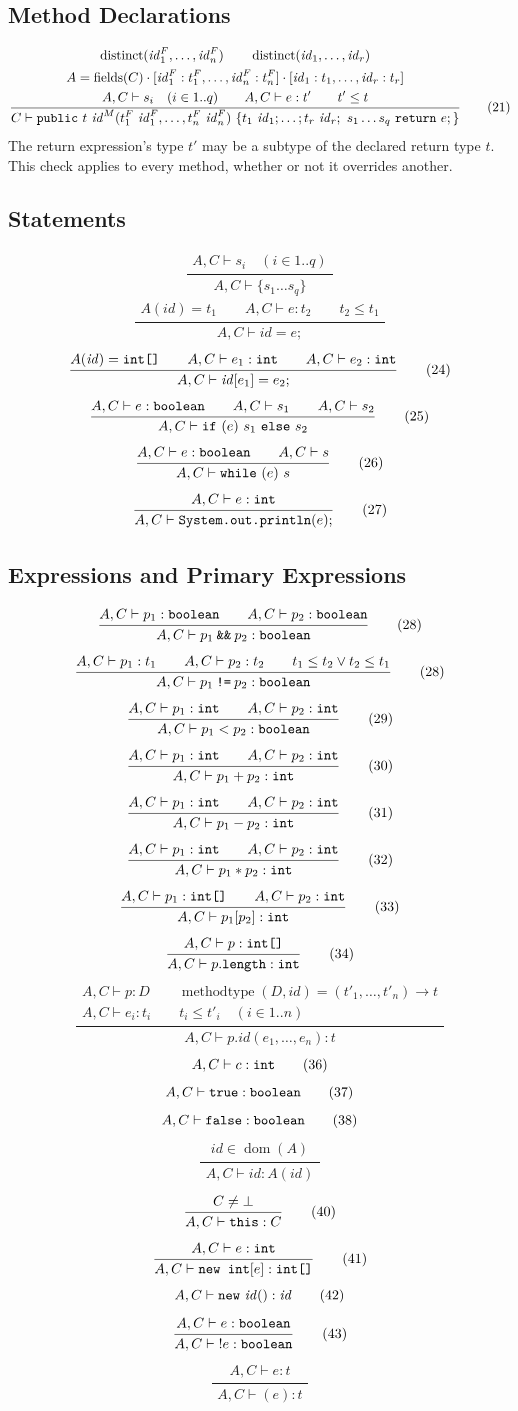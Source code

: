 \documentclass[11pt,a4paper]{article}
\newcommand{\kw}[1]{\text{\texttt{#1}}}
\newcommand{\mt}{\operatorname{methodtype}}
\newcommand{\fld}{\operatorname{fields}}
\newcommand{\dist}{\operatorname{distinct}}
\newcommand{\id}{\mathit{id}}
\newcommand{\ruleeq}[3]{\begin{equation}\frac{\begin{gathered}#2\end{gathered}}{\begin{gathered}#3\end{gathered}}\tag{#1}\end{equation}}
\newcommand{\axiom}[2]{\begin{equation}#2\tag{#1}\end{equation}}
\newcommand{\method}{\kw{public}\ t\ \id^M(t_1^F\ \id_1^F,\ldots,t_n^F\ \id_n^F)\ \{t_1\ \id_1;\ldots;t_r\ \id_r;\ s_1\ldots s_q\ \kw{return}\ e;\}}
\begin{document}
\subsection{Method Declarations}
\begingroup\small
\ruleeq{21}{\dist(\id_1^F,\ldots,\id_n^F)\qquad\dist(\id_1,\ldots,\id_r)\\
A=\fld(C)\cdot[\id_1^F:t_1^F,\ldots,\id_n^F:t_n^F]\cdot[\id_1:t_1,\ldots,\id_r:t_r]\\
A,C\vdash s_i\quad(i\in1..q)\qquad A,C\vdash e:t'\qquad t'\leq t}
{C\vdash\method}
\endgroup
The return expression's type $t'$ may be a subtype of the declared return type
$t$. This check applies to every method, whether or not it overrides another.
\subsection{Statements}
\ruleeq{22}{A,C\vdash s_i\quad(i\in1..q)}{A,C\vdash\{s_1\ldots s_q\}}
\ruleeq{23}{A(\id)=t_1\qquad A,C\vdash e:t_2\qquad t_2\leq t_1}{A,C\vdash\id=e;}
\ruleeq{24}{A(\id)=\kw{int[]}\qquad A,C\vdash e_1:\kw{int}\qquad A,C\vdash e_2:\kw{int}}{A,C\vdash\id[e_1]=e_2;}
\ruleeq{25}{A,C\vdash e:\kw{boolean}\qquad A,C\vdash s_1\qquad A,C\vdash s_2}{A,C\vdash\kw{if}\ (e)\ s_1\ \kw{else}\ s_2}
\ruleeq{26}{A,C\vdash e:\kw{boolean}\qquad A,C\vdash s}{A,C\vdash\kw{while}\ (e)\ s}
\ruleeq{27}{A,C\vdash e:\kw{int}}{A,C\vdash\kw{System.out.println}(e);}

\newpage
\subsection{Expressions and Primary Expressions}
\begingroup
\setlength{\abovedisplayskip}{7pt}\setlength{\belowdisplayskip}{7pt}
\ruleeq{28}{A,C\vdash p_1:\kw{boolean}\qquad A,C\vdash p_2:\kw{boolean}}{A,C\vdash p_1\mathbin{\kw{\&\&}}p_2:\kw{boolean}}
\ruleeq{28}{A,C\vdash p_1:t_1\qquad A,C\vdash p_2:t_2\qquad t_1 \leq t_2 \lor t_2 \leq t_1}{A,C\vdash p_1\mathbin{\kw{!=}}p_2:\kw{boolean}}
\ruleeq{29}{A,C\vdash p_1:\kw{int}\qquad A,C\vdash p_2:\kw{int}}{A,C\vdash p_1<p_2:\kw{boolean}}
\ruleeq{30}{A,C\vdash p_1:\kw{int}\qquad A,C\vdash p_2:\kw{int}}{A,C\vdash p_1+p_2:\kw{int}}
\ruleeq{31}{A,C\vdash p_1:\kw{int}\qquad A,C\vdash p_2:\kw{int}}{A,C\vdash p_1-p_2:\kw{int}}
\ruleeq{32}{A,C\vdash p_1:\kw{int}\qquad A,C\vdash p_2:\kw{int}}{A,C\vdash p_1*p_2:\kw{int}}
\ruleeq{33}{A,C\vdash p_1:\kw{int[]}\qquad A,C\vdash p_2:\kw{int}}{A,C\vdash p_1[p_2]:\kw{int}}
\ruleeq{34}{A,C\vdash p:\kw{int[]}}{A,C\vdash p.\kw{length}:\kw{int}}
\ruleeq{35}{A,C\vdash p:D\qquad\mt(D,\id)=(t'_1,\ldots,t'_n)\to t\\
A,C\vdash e_i:t_i\qquad t_i\leq t'_i\quad(i\in1..n)}{A,C\vdash p.\id(e_1,\ldots,e_n):t}
\axiom{36}{A,C\vdash c:\kw{int}}
\axiom{37}{A,C\vdash\kw{true}:\kw{boolean}}
\axiom{38}{A,C\vdash\kw{false}:\kw{boolean}}
\ruleeq{39}{\id\in\operatorname{dom}(A)}{A,C\vdash\id:A(\id)}
\ruleeq{40}{C\neq\bot}{A,C\vdash\kw{this}:C}
\ruleeq{41}{A,C\vdash e:\kw{int}}{A,C\vdash\kw{new\ int}[e]:\kw{int[]}}
\axiom{42}{A,C\vdash\kw{new}\ \id():\id}
\ruleeq{43}{A,C\vdash e:\kw{boolean}}{A,C\vdash {!e}:\kw{boolean}}
\ruleeq{44}{A,C\vdash e:t}{A,C\vdash(e):t}
\endgroup
\end{document}
